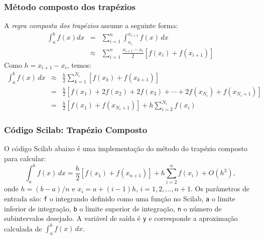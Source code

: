 \subsubsection{Método composto dos trapézios}
A \emph{regra composta dos trapézios} assume a seguinte forma:
\begin{eqnarray*}
  \int_{a}^b f(x)dx &=& \sum_{i=1}^{n} \int_{x_i}^{x_{i+1}}f(x)\,dx \\
  &\approx& \sum_{i=1}^{n} \frac{x_{i+1}-x_i}{2}\left[f(x_i)+f(x_{i+1})\right]
\end{eqnarray*}
Como $h = x_{i+1} - x_i$, temos:
\begin{eqnarray*}
\int_{a}^b f(x)\,dx &\approx& \frac{h}{2}\sum_{k=1}^{N_i}\left[f(x_k)+f(x_{k+1})\right]\\
&=& \frac{h}{2}\left[f(x_1)+2f(x_2)+2f(x_3)+\cdots + 2f(x_{N_i})+f(x_{N_i+1})\right]\\
&=& \frac{h}{2}\left[f(x_1) + f(x_{N_i+1})\right] + h\sum_{i=2}^{N_i} f(x_i)
\end{eqnarray*}

\ifisscilab
\subsubsection{Código Scilab: Trapézio Composto}
O código Scilab abaixo é uma implementação do método do trapézio composto para calcular:
\begin{equation*}
  \int_a^b f(x)\,dx = \frac{h}{2}\left[f(x_1) + f(x_{n+1})\right] + h\sum_{i=2}^n f(x_i) + O(h^3),
\end{equation*}
onde $h = (b-a)/n$ e $x_i = a + (i-1)h$, $i=1,2,\dotsc,n+1$. Os parâmetros de entrada são: \verb+f+ o integrando definido como uma função no Scilab, \verb+a+ o limite inferior de integração, \verb+b+ o limite superior de integração, \verb+n+ o número de subintervalos desejado. A variável de saída é \verb+y+ e corresponde a aproximação calculada de $\int_a^b f(x)\, dx$.


\fi

